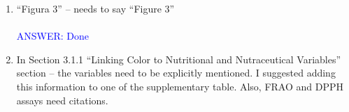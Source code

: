 \documentclass{article}
\begin{document}
\begin{enumerate}
    
    \item “Figura 3” – needs to say “Figure 3”\\\\
    \textcolor{blue}{ANSWER: Done}
    \item In Section 3.1.1 “Linking Color to Nutritional and Nutraceutical Variables” section – the variables need to be explicitly mentioned. I suggested adding this information to one of the supplementary table. Also, FRAO and DPPH assays need citations.\\\\

\end{enumerate}
\end{document}
